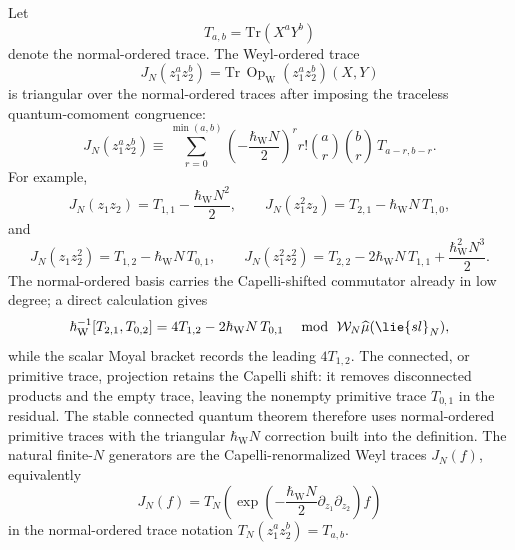 \documentclass[11pt]{memoir}
\begin{document}
\begin{rmk}\label{rmk:capelli-renormalized-traces}
  Let
  $$T_{a,b}=\mathrm{Tr}(X^aY^b)$$
  denote the normal-ordered trace. The Weyl-ordered trace
  $$J_N(z_1^az_2^b)=\mathrm{Tr}\,\operatorname{Op}_{\mathrm W}(z_1^az_2^b)(X,Y)$$
  is triangular over the normal-ordered traces after imposing the
  traceless quantum-comoment congruence:
  $$J_N(z_1^az_2^b)\equiv
    \sum_{r=0}^{\min(a,b)}
      \left(-\frac{\hbar_{\mathrm{W}}N}{2}\right)^r
      r!\binom ar\binom br\,T_{a-r,b-r}.$$
  For example,
  $$J_N(z_1z_2)=T_{1,1}-\frac{\hbar_{\mathrm{W}}N^2}{2},\qquad
    J_N(z_1^2z_2)=T_{2,1}-\hbar_{\mathrm{W}}N\,T_{1,0},$$
  and
  $$J_N(z_1z_2^2)=T_{1,2}-\hbar_{\mathrm{W}}N\,T_{0,1},\qquad
    J_N(z_1^2z_2^2)=T_{2,2}-2\hbar_{\mathrm{W}}N\,T_{1,1}
      +\frac{\hbar_{\mathrm{W}}^2N^3}{2}.$$
  The normal-ordered basis carries the Capelli-shifted commutator already
  in low degree; a direct calculation gives
  $$\hbar_{\mathrm{W}}^{-1}[T_{2,1},T_{0,2}]
    =4T_{1,2}-2\hbar_{\mathrm{W}}N\,T_{0,1}
    \quad\bmod\ \mathcal W_N\widehat\mu(\lie{sl}_N),$$
  while the scalar Moyal bracket records the leading $4T_{1,2}$. The
  connected, or primitive trace, projection retains the Capelli shift:
  it removes disconnected products and the empty trace, leaving the
  nonempty primitive trace $T_{0,1}$ in the residual. The stable
  connected quantum theorem therefore uses normal-ordered primitive
  traces with the triangular $\hbar_{\mathrm{W}}N$ correction built into the
  definition. The natural
  finite-$N$ generators are the Capelli-renormalized Weyl traces $J_N(f)$,
  equivalently
  $$J_N(f)=T_N\left(
    \exp\left(-\frac{\hbar_{\mathrm{W}}N}{2}\partial_{z_1}\partial_{z_2}\right)f
  \right)$$
  in the normal-ordered trace notation $T_N(z_1^az_2^b)=T_{a,b}$.
\end{rmk}
\end{document}
